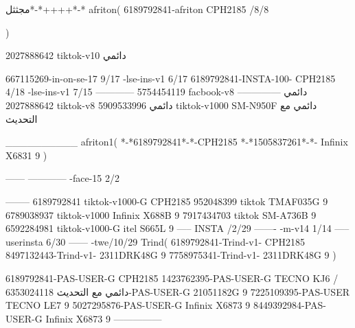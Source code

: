 مجثثل*-*++++*-*
afriton(
6189792841-afriton CPH2185  /8/8

)

2027888642 tiktok-v10
دائمي

667115269-in-on-se-17 9/17
-lse-ins-v1 6/17
6189792841-INSTA-100- CPH2185 4/18
-lse-ins-v1 7/15
------------
5754454119 facbook-v8
دائمي
--------------
2027888642 tiktok-v8
دائمي
5909533996 tiktok-v1000  SM-N950F
دائمي مع التحديث

__________
afriton1(
*-*6189792841*-*-CPH2185
*-*1505837261*-*-  Infinix X6831   9
)


------
------------
-face-15 2/2

--------
6189792841 tiktok-v1000-G CPH2185 
952048399 tiktok TMAF035G 9
6789038937 tiktok-v1000  Infinix X688B  9
7917434703 tiktok  SM-A736B  9
6592284981 tiktok-v1000-G  itel S665L  9
-----
 INSTA /2/29
-------
-m-v14 1/14
-----
userinsta 6/30
------
-twe/10/29
Trind(
6189792841-Trind-v1- CPH2185 
8497132443-Trind-v1- 2311DRK48G  9
7758975341-Trind-v1- 2311DRK48G  9
)


6189792841-PAS-USER-G CPH2185 
1423762395-PAS-USER-G TECNO KJ6  /دائمي مع التحديث
6353024118-PAS-USER-G   21051182G  9
7225109395-PAS-USER   TECNO LE7  9
5027295876-PAS-USER-G   Infinix X6873   9
8449392984-PAS-USER-G   Infinix X6873   9
    ---------------
